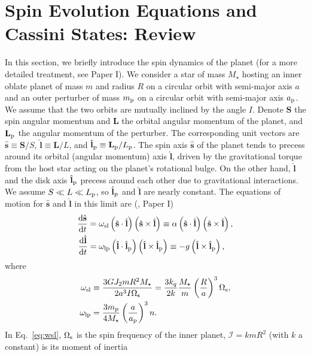 \documentclass[
        fleqn,
        usenatbib,
    ]{mnras}
\newcommand*{\rd}[2]{\frac{\mathrm{d}#1}{\mathrm{d}#2}}
\newcommand*{\p}[1]{\left(#1\right)}
\newcommand*{\bm}[1]{\mathbf{#1}}
\newcommand*{\uv}[1]{\hat{\mathbf{#1}}}
\begin{document}
\section{Spin Evolution Equations and Cassini States: Review}\label{s:theory}

In this section, we briefly introduce the spin dynamics of the planet (for a
more detailed treatment, see Paper I). We consider a star of mass $M_\star$
hosting an inner oblate planet of mass $m$ and radius $R$ on a circular orbit
with semi-major axis $a$ and an outer perturber of mass $m_{\rm p}$ on a
circular orbit with semi-major axis $a_{\rm p}$. We assume that the two orbits
are mutually inclined by the angle $I$. Denote $\bm{S}$ the spin angular
momentum and $\bm{L}$ the orbital angular momentum of the planet, and
$\bm{L}_{\rm p}$ the angular momentum of the perturber. The corresponding unit
vectors are $\uv{s} \equiv \bm{S} / S$, $\uv{l} \equiv \bm{L} / L$, and
$\uv{l}_{\rm p} \equiv \bm{L}_{\rm p} / L_{\rm p}$. The spin axis $\uv{s}$ of
the planet tends to precess around its orbital (angular momentum) axis $\uv{l}$,
driven by the gravitational torque from the host star acting on the planet's
rotational bulge. On the other hand, $\uv{l}$ and the disk axis $\uv{l}_{\rm p}$
precess around each other due to gravitational interactions. We assume $S \ll L
\ll L_{\rm p}$, so $\uv{l}_{\rm p}$ and $\uv{l}$ are nearly constant. The
equations of motion for $\uv{s}$ and $\uv{l}$ in this limit are
(\citealp{anderson2018teeter}, Paper I)
\begin{align}
    \rd{\uv{s}}{t}
        &= \omega_{\rm sl}\p{\uv{s} \cdot \uv{l}}\p{\uv{s} \times \uv{l}}
        \equiv \alpha\p{\uv{s} \cdot \uv{l}}\p{\uv{s} \times
        \uv{l}},\label{eq:dsdt1}\\
    \rd{\uv{l}}{t} &= \omega_{\rm lp}\p{\uv{l} \cdot \uv{l}_{\rm p}}\p{\uv{l}
        \times \uv{l}_{\rm p}} \equiv -g\p{\uv{l} \times \uv{l}_{\rm p}},
        \label{eq:dldt1}
\end{align}
where
\begin{align}
    \omega_{\rm sl} &\equiv \frac{3GJ_2 mR^2 M_\star}{2a^3 I\Omega_{\rm s}}
        = \frac{3k_q}{2k}\frac{M_\star}{m}\p{\frac{R}{a}}^3 \Omega_{\rm s},
            \label{eq:wsl}\\
    \omega_{\rm lp} &= \frac{3m_{\rm p}}{4M_\star}\p{\frac{a}{a_{\rm p}}}^3
        n.\label{eq:wlp}
\end{align}
In Eq.~\eqref{eq:wsl}, $\Omega_{\rm s}$ is the spin frequency of the inner
planet, $\mathcal{I} = k mR^2$ (with $k$ a constant) is its moment of inertia
\end{document}
